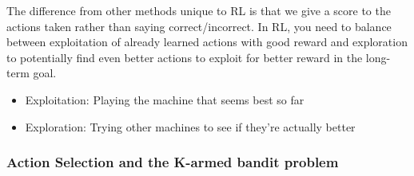 The difference from other methods unique to RL is that we give a score to the actions taken rather than saying correct/incorrect.
In RL, you need to balance between exploitation of already learned actions with good reward and exploration to potentially find even better actions to exploit for better reward in the long-term goal.
\begin{itemize}
\item Exploitation: Playing the machine that seems best so far
\item Exploration: Trying other machines to see if they're actually better
\end{itemize}



\subsubsection{Action Selection and the K-armed bandit problem}


